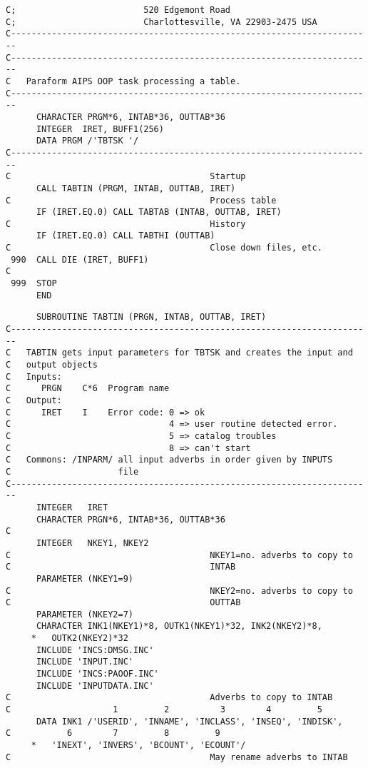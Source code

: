 {{\begin{verbatim}
C;                         520 Edgemont Road
C;                         Charlottesville, VA 22903-2475 USA
C-----------------------------------------------------------------------
C-----------------------------------------------------------------------
C   Paraform AIPS OOP task processing a table.
C-----------------------------------------------------------------------
      CHARACTER PRGM*6, INTAB*36, OUTTAB*36
      INTEGER  IRET, BUFF1(256)
      DATA PRGM /'TBTSK '/
C-----------------------------------------------------------------------
C                                       Startup
      CALL TABTIN (PRGM, INTAB, OUTTAB, IRET)
C                                       Process table
      IF (IRET.EQ.0) CALL TABTAB (INTAB, OUTTAB, IRET)
C                                       History
      IF (IRET.EQ.0) CALL TABTHI (OUTTAB)
C                                       Close down files, etc.
 990  CALL DIE (IRET, BUFF1)
C
 999  STOP
      END
\end{verbatim}
\begin{verbatim}
      SUBROUTINE TABTIN (PRGN, INTAB, OUTTAB, IRET)
C-----------------------------------------------------------------------
C   TABTIN gets input parameters for TBTSK and creates the input and
C   output objects
C   Inputs:
C      PRGN    C*6  Program name
C   Output:
C      IRET    I    Error code: 0 => ok
C                               4 => user routine detected error.
C                               5 => catalog troubles
C                               8 => can't start
C   Commons: /INPARM/ all input adverbs in order given by INPUTS
C                     file
C-----------------------------------------------------------------------
      INTEGER   IRET
      CHARACTER PRGN*6, INTAB*36, OUTTAB*36
C
      INTEGER   NKEY1, NKEY2
C                                       NKEY1=no. adverbs to copy to
C                                       INTAB
      PARAMETER (NKEY1=9)
C                                       NKEY2=no. adverbs to copy to
C                                       OUTTAB
      PARAMETER (NKEY2=7)
      CHARACTER INK1(NKEY1)*8, OUTK1(NKEY1)*32, INK2(NKEY2)*8,
     *   OUTK2(NKEY2)*32
      INCLUDE 'INCS:DMSG.INC'
      INCLUDE 'INPUT.INC'
      INCLUDE 'INCS:PAOOF.INC'
      INCLUDE 'INPUTDATA.INC'
C                                       Adverbs to copy to INTAB
C                    1         2          3        4         5
      DATA INK1 /'USERID', 'INNAME', 'INCLASS', 'INSEQ', 'INDISK',
C           6        7         8         9
     *   'INEXT', 'INVERS', 'BCOUNT', 'ECOUNT'/
C                                       May rename adverbs to INTAB

\end{verbatim}}}
